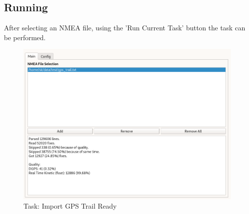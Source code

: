\subsection{Running}

After selecting an NMEA file, using the 'Run Current Task' button the task can be performed.

\begin{figure}[H]
    \includegraphics[width=16cm,frame]{../screenshots/gps_import_ready.png}
  \caption{Task: Import GPS Trail Ready}
\end{figure}
